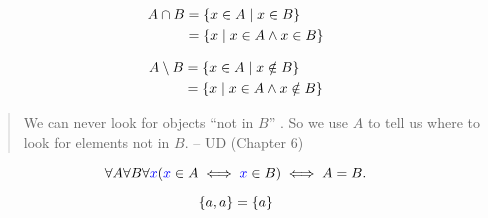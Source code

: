 \begin{frame}{}
  \begin{definition}[``$\cap$'']
    \vspace{-0.50cm}
    \begin{align*}
      A \cap B &= \{x \in A \mid x \in B\} \\
	       &= \{x \mid x \in A \land x \in B\}
    \end{align*}
  \end{definition}

  \vspace{0.80cm}
  \begin{definition}[``$\setminus$'']
    \vspace{-0.50cm}
    \begin{align*}
      A \setminus B &= \{x \in A \mid x \notin B\} \\
	       &= \{x \mid x \in A \land x \notin B\}
    \end{align*}
  \end{definition}

  \pause
  \vspace{0.30cm}
  \begin{quote}
    We can never look for objects ``not in $B$'' .
    So we use $A$ to tell us where to look for elements not in $B$.
    \hfill -- UD (Chapter 6)
  \end{quote}
\end{frame}

\begin{frame}{}
  \begin{definition}
    \[
      \forall A \forall B \forall \textcolor{blue}{x} (\textcolor{blue}{x} \in A \iff \textcolor{blue}{x} \in B) \iff A = B.
    \]
  \end{definition}

  \pause
  \[
    \{a, a\} = \{a\}
  \]


\end{frame}

% 
% 
% 
% 
